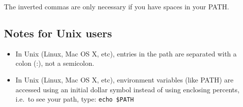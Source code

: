 \documentclass{article}
\begin{document}
The inverted commas are only necessary if you have spaces in your PATH.

\subsection{Notes for Unix users}
\label{sec:notes-unix-users}

\begin{itemize}
\item In Unix (Linux, Mac OS X, etc), entries in the path are
  separated with a colon (:), not a semicolon.
\item In Unix (Linux, Mac OS X, etc), environment variables (like
  PATH) are accessed using an initial dollar symbol instead of using
  enclosing percents, i.e.~to see your path, type: \verb+echo $PATH+
\end{itemize}
\end{document}
